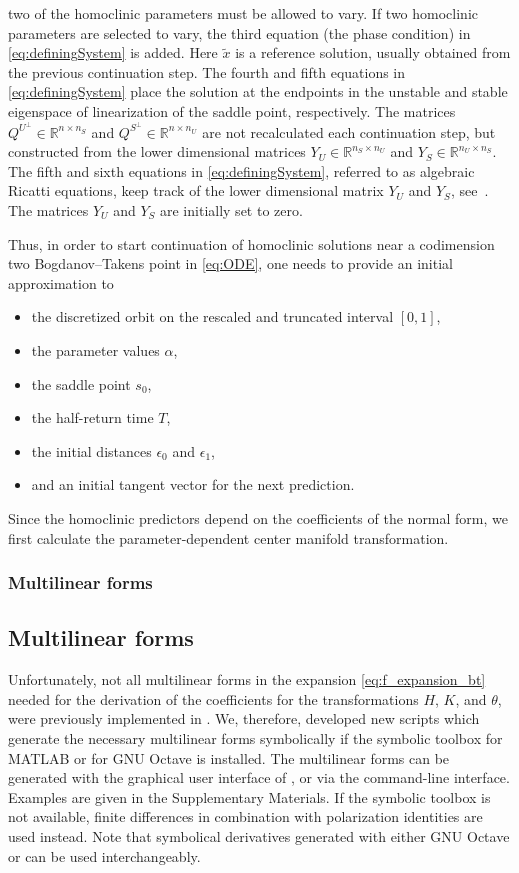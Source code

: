 two of the homoclinic parameters must be allowed to vary. If two homoclinic
parameters are selected to vary, the third equation (the phase condition) in
\cref{eq:definingSystem} is added. Here $\tilde x$ is a reference solution,
usually obtained from the previous continuation step. The fourth and fifth
equations in \cref{eq:definingSystem} place the solution at the endpoints in
the unstable and stable eigenspace of linearization of the saddle point,
respectively. The matrices $Q^{U^{\perp}} \in \mathbb{R}^{n \times n_{S}}$ and
$Q^{S^{\perp}} \in \mathbb{R}^{n \times n_{U}}$ are not recalculated each
continuation step, but constructed from the lower dimensional matrices $Y_{U}
\in \mathbb{R}^{n_{S} \times n_{U}}$ and $Y_{S} \in \mathbb{R}^{n_{U} \times
n_{S}}$. The fifth and sixth equations in \cref{eq:definingSystem}, referred to
as algebraic Ricatti equations, keep track of the lower dimensional matrix
$Y_U$ and $Y_S$, see~\cite{Friedman2001Continuation}. The matrices $Y_U$ and
$Y_S$ are initially set to zero.

Thus, in order to start continuation of homoclinic solutions near a codimension
two Bogdanov--Takens point in \cref{eq:ODE}, one needs to provide an initial
approximation to
\begin{itemize}
    \item the discretized orbit on the rescaled and truncated interval $[0,1]$,
    \item the parameter values $\alpha$,
    \item the saddle point $s_0$,
    \item the half-return time $T$,
    \item the initial distances $\epsilon_0$ and $\epsilon_1$,
    \item and an initial tangent vector for the next prediction.
\end{itemize}

Since the homoclinic predictors depend on the coefficients of the normal form,
we first calculate the parameter-dependent center manifold transformation.

\ifthesis
\subsubsection{Multilinear forms}
\else
\subsection{Multilinear forms}
\fi
Unfortunately, not all multilinear forms in the expansion
\cref{eq:f_expansion_bt} needed for the derivation of the coefficients for the
transformations $H$, $K$, and $\theta$, were previously implemented in \MATCONT.  We,
therefore, developed new scripts which generate the necessary multilinear
forms symbolically if the symbolic toolbox for MATLAB or for GNU Octave is
installed.  The multilinear forms can be generated with the graphical user
interface of \MATCONT, or via the command-line interface.  Examples are given in
the Supplementary Materials.  If the symbolic toolbox is not
available, finite differences in combination with polarization identities are
used instead.  Note that symbolical derivatives generated with either GNU
Octave or \MATCONT can be used interchangeably.

